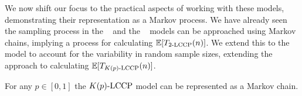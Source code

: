 \label{Markov:Finite-MECD}
We now shift our focus to the practical aspects of working with these models, demonstrating their representation as a Markov process.
We have already seen the sampling process in the \eccpg~\cite{Survey_ccp} and the ~\cite{barlev2024} models
can be approached using Markov chains,
implying a process for calculating $\E[\T{\kecd{2}{n}}{n}]$.
We extend this to the  model to account for the variability in random sample sizes,
extending the approach to calculating $\E[\T{\fmecd{K(p)}{}{n}}{n}]$.
\begin{theorem}
For any $p \in [0,1]$ the $\fmecd{K(p)}{}{n}$ model can be represented as a Markov chain. 
\label{Markov:(1;2)-MECD}
\end{theorem}
